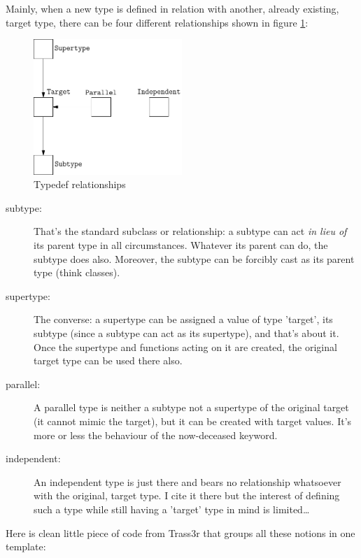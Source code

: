 Mainly, when a new type is defined in relation with another, already existing, target type, there can be four different relationships shown in figure \ref{fig:typedef}:

\begin{figure}[htb]
\centering
\includegraphics[width=0.5\textwidth]{typedef}
\caption{Typedef relationships}
\label{fig:typedef}
\end{figure}

\begin{description}
\item[subtype:] That's the standard subclass or  relationship: a subtype can act \emph{in lieu of} its parent type in all circumstances. Whatever its parent can do, the subtype does also. Moreover, the subtype can be forcibly cast as its parent type (think classes).
\item[supertype:] The converse: a supertype can be assigned a value of type 'target', its subtype (since a subtype can act as its supertype), and that's about it. Once the supertype and functions acting on it are created, the original target type can be used there also.
\item[parallel:] A parallel type is neither a subtype not a supertype of the original target (it cannot mimic the target), but it can be created with target values. It's more or less the behaviour of the now-deceased  keyword.
\item[independent:] An independent type is just there and bears no relationship whatsoever with the original, target type. I cite it there but the interest of defining such a type while still having a 'target' type in mind is limited\ldots
\end{description}

Here is clean little piece of code from Trass3r that groups all these notions in one template:

